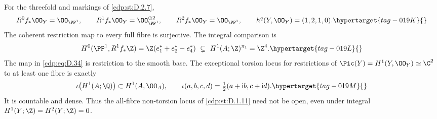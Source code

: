 \begin{proposition}\hypertarget{tag-01GF}{}\label{cdp:st:D.2.8}


For the threefold and markings of \ref{cdp:st:D.2.7},
\begin{equation}
 R^0f_*\OO_Y=\OO_{\PP^1},\qquad
 R^1f_*\OO_Y=\OO_{\PP^1}^{\oplus2},\qquad
 R^2f_*\OO_Y=\OO_{\PP^1},
 \qquad h^q(Y,\OO_Y)=(1,2,1,0).
\hypertarget{tag-019K}{}\label{cdp:eq:D.33}
\end{equation}
The coherent restriction map to every full fibre is surjective.
The integral comparison is
\begin{equation}
 H^0(\PP^1,R^1f_*\Z)
   =\Z(e_1^*+e_2^*-e_4^*)
   \ \subsetneq\ H^1(A;\Z)^{\pi_1}=\Z^4.
\hypertarget{tag-019L}{}\label{cdp:eq:D.34}
\end{equation}
The map in \eqref{cdp:eq:D.34} is restriction to the smooth base. The exceptional torsion locus
for restrictions of $\Pic(Y)=H^1(Y,\OO_Y)\simeq\C^2$ to
at least one fibre is exactly
\begin{equation}
 \iota\bigl(H^1(A;\Q)\bigr)\subset H^1(A,\OO_A),
 \qquad
 \iota(a,b,c,d)=\tfrac12(a+\mathrm i b,c+\mathrm i d).
\hypertarget{tag-019M}{}\label{cdp:eq:D.35}
\end{equation}
It is countable and dense. Thus the all-fibre non-torsion locus
of \ref{cdp:st:D.1.11} need not be open, even under integral
$H^1(Y;\Z)=H^2(Y;\Z)=0$.
\end{proposition}


